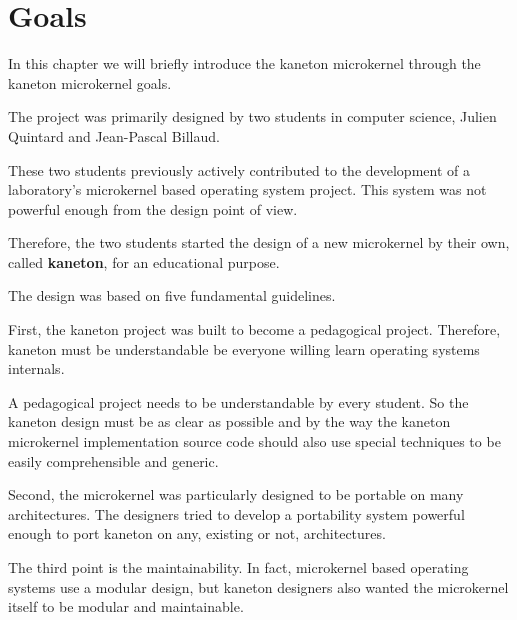 %
%
%
%
%
%

%
%

\chapter{Goals}

In this chapter we will briefly introduce the kaneton microkernel
through the kaneton microkernel goals.

\newpage

%
%

The project was primarily designed by two students in computer science,
Julien Quintard and Jean-Pascal Billaud.

These two students previously actively contributed to the development
of a laboratory's microkernel based operating system project. This system
was not powerful enough from the design point of view.

Therefore, the two students started the design of a new microkernel
by their own, called \textbf{kaneton}, for an educational purpose.

The design was based on five fundamental guidelines.

First, the kaneton project was built to become a pedagogical project.
Therefore, kaneton must be understandable be everyone willing learn
operating systems internals.

A pedagogical project needs to be understandable by every student. So
the kaneton design must be as clear as possible and by the way the
kaneton microkernel implementation source code should also use
special techniques to be easily comprehensible and generic.

Second, the microkernel was particularly designed to be portable on many
architectures. The designers tried to develop a portability system powerful
enough to port kaneton on any, existing or not, architectures.

The third point is the maintainability. In fact, microkernel based
operating systems use a modular design, but kaneton designers
also wanted the microkernel itself to be modular and maintainable.

